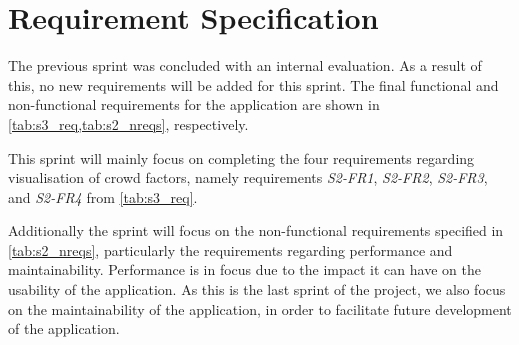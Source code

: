 \section{Requirement Specification} \label{sec:s4_reqs}
The previous sprint was concluded with an internal evaluation. As a result of this, no new requirements will be added for this sprint. The final functional and non-functional requirements for the application are shown in \cref{tab:s3_req,tab:s2_nreqs}, respectively.

This sprint will mainly focus on completing the four requirements regarding visualisation of crowd factors, namely requirements \emph{S2-FR1}, \emph{S2-FR2}, \emph{S2-FR3}, and \emph{S2-FR4} from \cref{tab:s3_req}.

Additionally the sprint will focus on the non-functional requirements specified in \cref{tab:s2_nreqs}, particularly the requirements regarding performance and maintainability. Performance is in focus due to the impact it can have on the usability of the application. As this is the last sprint of the project, we also focus on the maintainability of the application, in order to facilitate future development of the application.